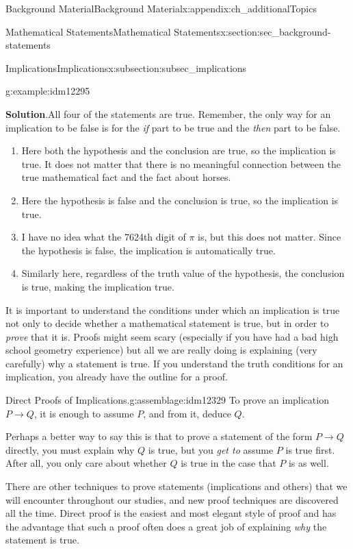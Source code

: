 \documentclass[oneside,10pt,]{book}
\numberwithin{equation}{chapter}
\def\imp{\rightarrow}
\begin{document}
\begin{appendixptx}{Background Material}{}{Background Material}{}{}{x:appendix:ch_additionalTopics}
\begin{sectionptx}{Mathematical Statements}{}{Mathematical Statements}{}{}{x:section:sec_background-statements}
\begin{subsectionptx}{Implications}{}{Implications}{}{}{x:subsection:subsec_implications}
\begin{example}{}{g:example:idm12295}
\begin{enumerate}
\end{enumerate}
%
\par\smallskip%
\noindent\textbf{Solution}.\hypertarget{g:solution:idm12313}{}\quad{}All four of the statements are true. Remember, the only way for an implication to be false is for the \emph{if} part to be true and the \emph{then} part to be false.%
\begin{enumerate}
\item{}Here both the hypothesis and the conclusion are true, so the implication is true. It does not matter that there is no meaningful connection between the true mathematical fact and the fact about horses.%
\item{}Here the hypothesis is false and the conclusion is true, so the implication is true.%
\item{}I have no idea what the 7624th digit of \(\pi\) is, but this does not matter. Since the hypothesis is false, the implication is automatically true.%
\item{}Similarly here, regardless of the truth value of the hypothesis, the conclusion is true, making the implication true.%
\end{enumerate}
%
\end{example}
It is important to understand the conditions under which an implication is true not only to decide whether a mathematical statement is true, but in order to \emph{prove} that it is. Proofs might seem scary (especially if you have had a bad high school geometry experience) but all we are really doing is explaining (very carefully) why a statement is true. If you understand the truth conditions for an implication, you already have the outline for a proof.%
\begin{assemblage}{Direct Proofs of Implications.}{g:assemblage:idm12329}%
To prove an implication \(P \imp Q\), it is enough to assume \(P\), and from it, deduce \(Q\).%
\end{assemblage}
Perhaps a better way to say this is that to prove a statement of the form \(P \imp Q\) directly, you must explain why \(Q\) is true, but you \emph{get to} assume \(P\) is true first.  After all, you only care about whether \(Q\) is true in the case that \(P\) is as well.%
\par
There are other techniques to prove statements (implications and others) that we will encounter throughout our studies, and new proof techniques are discovered all the time. Direct proof is the easiest and most elegant style of proof and has the advantage that such a proof often does a great job of explaining \emph{why} the statement is true.%

\end{subsectionptx}
\end{sectionptx}
\end{appendixptx}
\end{document}
